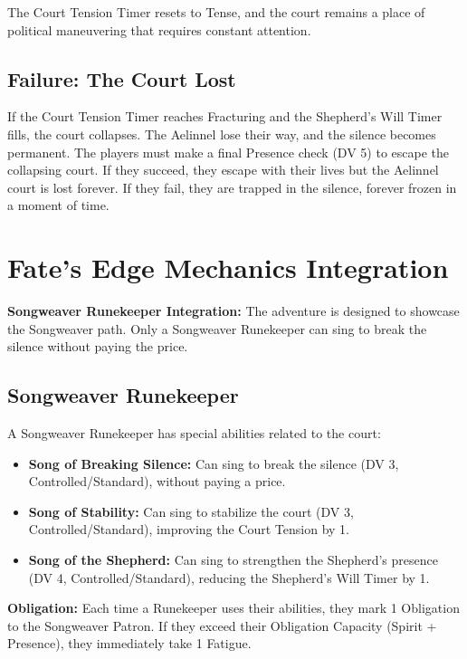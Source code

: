 \documentclass{article}
\begin{document}
The Court Tension Timer resets to Tense, and the court remains a place of political maneuvering that requires constant attention.

\subsection{Failure: The Court Lost}

If the Court Tension Timer reaches Fracturing and the Shepherd's Will Timer fills, the court collapses. The Aelinnel lose their way, and the silence becomes permanent. The players must make a final Presence check (DV 5) to escape the collapsing court. If they succeed, they escape with their lives but the Aelinnel court is lost forever. If they fail, they are trapped in the silence, forever frozen in a moment of time.

\section{Fate's Edge Mechanics Integration}

\begin{mechanicbox}
\textbf{Songweaver Runekeeper Integration:} The adventure is designed to showcase the Songweaver path. Only a Songweaver Runekeeper can sing to break the silence without paying the price.
\end{mechanicbox}

\subsection{Songweaver Runekeeper}

A Songweaver Runekeeper has special abilities related to the court:

\begin{itemize}
    \item \textbf{Song of Breaking Silence:} Can sing to break the silence (DV 3, Controlled/Standard), without paying a price.
    \item \textbf{Song of Stability:} Can sing to stabilize the court (DV 3, Controlled/Standard), improving the Court Tension by 1.
    \item \textbf{Song of the Shepherd:} Can sing to strengthen the Shepherd's presence (DV 4, Controlled/Standard), reducing the Shepherd's Will Timer by 1.
\end{itemize}

\textbf{Obligation:} Each time a Runekeeper uses their abilities, they mark 1 Obligation to the Songweaver Patron. If they exceed their Obligation Capacity (Spirit + Presence), they immediately take 1 Fatigue.
\end{document}
